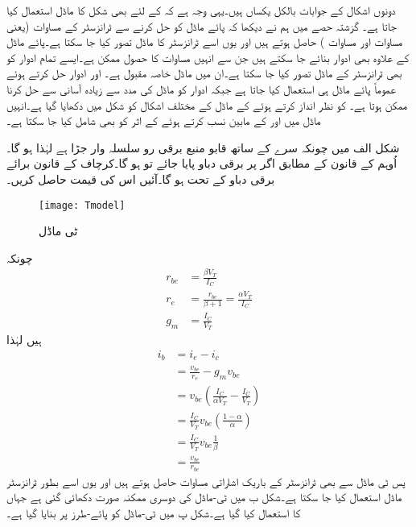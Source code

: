 دونوں اشکال کے جوابات بالکل یکساں ہیں۔یہی وجہ ہے کہ  کے لئے بھی شکل  کا ماڈل استعمال کیا جاتا ہے۔
 
گزشتہ حصے میں ہم نے دیکھا کہ پائے ماڈل کو حل کرنے سے ٹرانزسٹر کے مساوات (یعنی مساوات   اور مساوات  ) حاصل ہوتے ہیں اور یوں اسے ٹرانزسٹر کا ماڈل تصور کیا جا سکتا ہے۔پائے ماڈل کے علاوہ بھی ادوار بنائے جا سکتے ہیں جن سے انہیں مساوات کا حصول ممکن ہے۔ایسے تمام ادوار کو بھی ٹرانزسٹر کے ماڈل تصور کیا جا سکتا ہے۔ان میں  ماڈل خاصہ مقبول ہے۔ اور   ادوار حل کرتے ہوئے عموماً پائے ماڈل ہی استعمال کیا جاتا ہے جبکہ  ادوار کو  ماڈل کی مدد سے زیادہ آسانی سے حل کرنا ممکن ہوتا ہے۔ کو نظر انداز کرتے ہوئے   کے  ماڈل کے مختلف اشکال کو شکل  میں دکھایا گیا ہے۔انہیں ماڈل میں  اور  کے مابین  نسب کرتے ہوئے  کے اثر کو بھی شامل کیا جا سکتا ہے۔

شکل  الف میں چونکہ  سرے کے ساتھ قابو منبع برقی رو سلسلہ وار جڑا ہے لہٰذا   ہو گا۔ اُوہم کے قانون کے مطابق اگر   پر  برقی دباو پایا جائے تو   ہو گا۔کرچاف کے قانون برائے برقی دباو کے تحت  ہو گا۔آئیں اس کی قیمت حاصل کریں۔
\begin{figure}
\centering
\texttt{[image: Tmodel]}
\caption{ٹی ماڈل}
\label{شکل_ٹی_ماڈل}
\end{figure}
	چونکہ
\begin{align*}
r_{be}&=\frac{\beta V_T}{I_C}\\
r_e &=\frac{r_{be}}{\beta+1}=\frac{\alpha V_T}{I_C}\\
g_m &=\frac{I_C}{V_T}
\end{align*}
ہیں لہٰذا
\begin{align*}
i_b&=i_e-i_c\\
&=\frac{v_{be}}{r_e}-g_m v_{be}\\
&=v_{be} \left (\frac{I_C}{\alpha V_T} - \frac{I_C}{V_T} \right )\\
&=\frac{I_C}{V_T} v_{be} \left(\frac{1-\alpha}{\alpha} \right )\\
&=\frac{I_C}{V_T} v_{be} \frac{1}{\beta}\\
&=\frac{v_{be}}{r_{be}}
\end{align*}
پس ٹی   ماڈل سے بھی ٹرانزسٹر کے باریک اشاراتی مساوات حاصل ہوتے ہیں اور یوں اسے بطور ٹرانزسٹر ماڈل استعمال کیا جا سکتا ہے۔شکل  ب میں ٹی-ماڈل کی دوسری ممکنہ صورت دکھائی گئی ہے جہاں  کا استعمال کیا گیا ہے۔شکل  پ میں ٹی-ماڈل کو پائے-طرز پر بنایا گیا ہے۔

